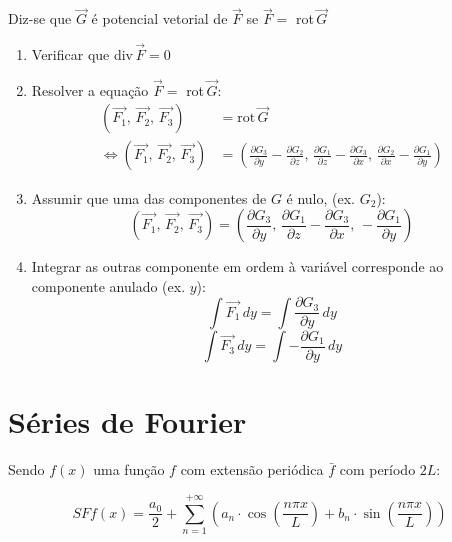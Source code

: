 \documentclass[11pt, a4paper]{article}
\begin{document}
Diz-se que $\vec{G}$ é potencial vetorial de $\vec{F}$ se $\vec{F} =$ rot\,$\vec{G}$

\begin{enumerate}
    \item Verificar que div\,$\vec{F} = 0$
    \item Resolver a equação $\vec{F} =$ rot\,$\vec{G}$:
          \begin{align*}
              \left(\vec{F_1},\,\vec{F_2},\,\vec{F_3}\right) & = \text{rot}\,\vec{G}
              \\ \Leftrightarrow
              \left(\vec{F_1},\,\vec{F_2},\,\vec{F_3}\right) & =
              \left(\frac{\partial G_3}{\partial y} - \frac{\partial G_2}{\partial z}
              ,\,\frac{\partial G_1}{\partial z} - \frac{\partial G_3}{\partial x}
              ,\,\frac{\partial G_2}{\partial x} - \frac{\partial G_1}{\partial y}
              \right)
          \end{align*}
    \item Assumir que uma das componentes de $G$ é nulo, (ex. $G_2$):
          \begin{equation*}
              \left(\vec{F_1},\,\vec{F_2},\,\vec{F_3}\right) =
              \left(\frac{\partial G_3}{\partial y}
              ,\,\frac{\partial G_1}{\partial z} - \frac{\partial G_3}{\partial x}
              ,\, - \frac{\partial G_1}{\partial y}
              \right)
          \end{equation*}
    \item Integrar as outras componente em ordem à variável corresponde ao
          componente anulado (ex. $y$):
          \begin{equation*}
              \int \vec{F_1} \,dy = \int \frac{\partial G_3}{\partial y} \,dy
          \end{equation*}
          \begin{equation*}
              \int \vec{F_3} \,dy = \int -\frac{\partial G_1}{\partial y} \,dy
          \end{equation*}
\end{enumerate}

\newpage

\section{Séries de Fourier}

Sendo $f(x)$ uma função $f$ com extensão periódica $\bar{f}$ com período $2L$:

\begin{equation*}
    SFf(x) = \frac{a_0}{2} + \sum_{n=1}^{+\infty}
    \left(
    a_n \cdot \cos\left(\frac{n\pi x}{L}\right) +
    b_n \cdot \sin\left(\frac{n\pi x}{L}\right)
    \right)
\end{equation*}
\end{document}
